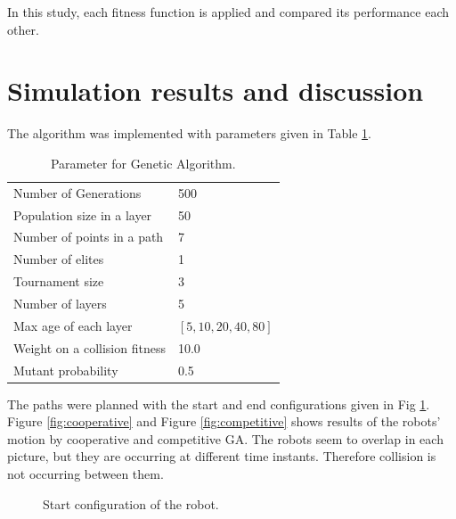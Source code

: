 \documentclass[12pt]{article} %
\begin{document}
In this study, each fitness function is applied and compared its performance each other.
 
\section{Simulation results and discussion}
The algorithm was implemented with parameters given in Table \ref{tab:parameter}.   
\begin{table}[H]
  \begin{center}
    \caption{Parameter for Genetic Algorithm.}
    \label{tab:parameter}
    \begin{tabular}{ll} 
	\hline      
      Number of Generations          & 500  \\
      Population size in a layer    & 50   \\
      Number of points in a path    & 7 \\       
	  Number of elites              & 1 \\
	  Tournament size               & 3 \\
      Number of layers              & 5 \\
      Max age of each layer         & $ \left[ 5, 10, 20, 40, 80 \right] $\\
	  Weight on a collision fitness & 10.0 \\
	  Mutant probability            & 0.5  \\
	\hline      
    \end{tabular}
  \end{center}
 \end{table}
The paths were planned with the start and end configurations given in Fig \ref{fig:startconfig}. Figure \ref{fig:cooperative} and Figure \ref{fig:competitive} shows results of the robots' motion by cooperative and competitive GA. The robots seem to overlap in each picture, but they are occurring at different time instants. Therefore collision is not occurring between them. 
  
\begin{figure}[H] %
\caption{Start configuration of the robot.}
\label{fig:startconfig}
\end{figure}
\end{document}

